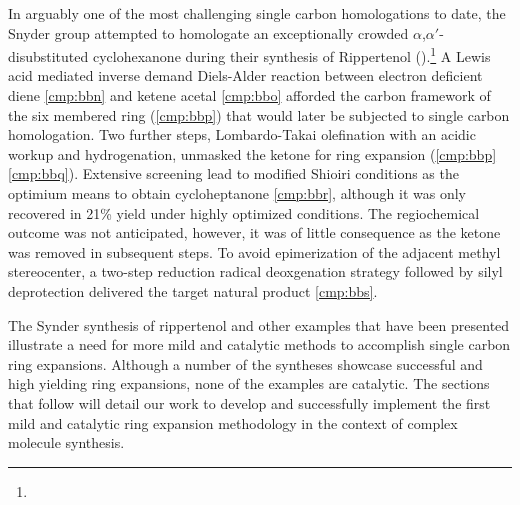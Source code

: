 In arguably one of the most challenging single
carbon homologations to date, the Snyder group attempted to
homologate an exceptionally crowded $\alpha$,$\alpha'$-disubstituted
cyclohexanone during their synthesis of
Rippertenol ().\footnote{} A Lewis acid mediated inverse demand Diels-Alder reaction between
electron deficient diene \ref{cmp:bbn} and ketene acetal \ref{cmp:bbo} afforded
the carbon framework of the six membered ring (\ce{->}\ref{cmp:bbp}) that would later
be subjected to single carbon homologation. Two further steps, Lombardo-Takai
olefination with an acidic workup and hydrogenation, unmasked the ketone for ring
expansion (\ref{cmp:bbp} \ce{->} \ref{cmp:bbq}). Extensive screening lead to modified
Shioiri conditions as the optimium means to obtain
cycloheptanone \ref{cmp:bbr}, although it was only recovered in 21\% yield under
highly optimized conditions. The regiochemical outcome was not anticipated,
however, it was of little consequence as the ketone was removed in subsequent
steps. To avoid epimerization of the adjacent methyl stereocenter, a two-step
reduction radical deoxgenation strategy followed by silyl deprotection delivered
the target natural product \ref{cmp:bbs}. 

The Synder synthesis of rippertenol and other examples that have been presented
illustrate a need for more mild and catalytic methods to accomplish single
carbon ring expansions. Although a number of the syntheses showcase successful
and high yielding ring expansions, none of the examples are catalytic. The
sections that follow will detail our work to develop and successfully implement
the first mild and catalytic ring expansion methodology in the context of
complex molecule synthesis.

